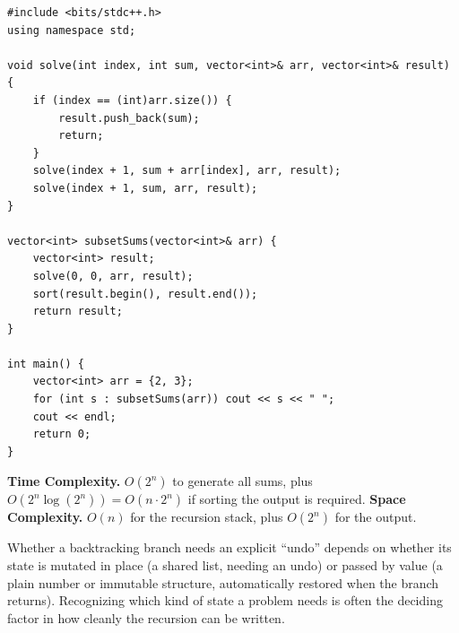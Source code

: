 \begin{lstlisting}
#include <bits/stdc++.h>
using namespace std;

void solve(int index, int sum, vector<int>& arr, vector<int>& result) {
    if (index == (int)arr.size()) {
        result.push_back(sum);
        return;
    }
    solve(index + 1, sum + arr[index], arr, result);
    solve(index + 1, sum, arr, result);
}

vector<int> subsetSums(vector<int>& arr) {
    vector<int> result;
    solve(0, 0, arr, result);
    sort(result.begin(), result.end());
    return result;
}

int main() {
    vector<int> arr = {2, 3};
    for (int s : subsetSums(arr)) cout << s << " ";
    cout << endl;
    return 0;
}
\end{lstlisting}

\begin{complexitybox}
\textbf{Time Complexity.} $O(2^n)$ to generate all sums, plus
$O(2^n \log(2^n)) = O(n \cdot 2^n)$ if sorting the output is required.
\textbf{Space Complexity.} $O(n)$ for the recursion stack, plus
$O(2^n)$ for the output.
\end{complexitybox}

\begin{takeawaybox}
Whether a backtracking branch needs an explicit ``undo'' depends on
whether its state is mutated in place (a shared list, needing an undo)
or passed by value (a plain number or immutable structure, automatically
restored when the branch returns). Recognizing which kind of state a
problem needs is often the deciding factor in how cleanly the recursion
can be written.
\end{takeawaybox}
